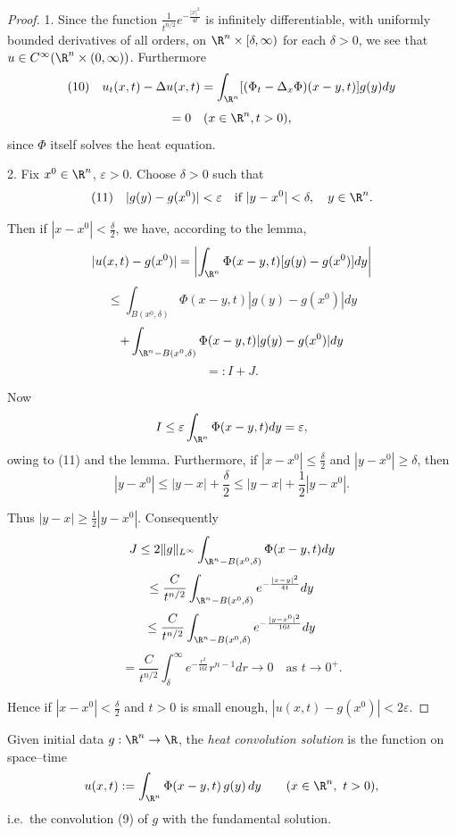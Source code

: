 \begin{proof}
1. Since the function $\frac{1}{t^{n/2}} e^{-\frac{|x|^2}{4t}}$ is infinitely differentiable, with uniformly bounded derivatives of all orders, on $\R^n \times [\delta, \infty)$ for each $\delta > 0$, we see that $u \in C^\infty(\R^n \times (0,\infty))$. Furthermore
$$(10) \quad u_t(x,t) - \Delta u(x,t) = \int_{\R^n} [(\Phi_t - \Delta_x \Phi)(x-y,t)]g(y) dy$$
$$= 0 \quad (x \in \R^n, t > 0),$$
since $\Phi$ itself solves the heat equation.

2. Fix $x^0 \in \R^n$, $\varepsilon > 0$. Choose $\delta > 0$ such that
$$(11) \quad |g(y) - g(x^0)| < \varepsilon \quad \text{if } |y - x^0| < \delta, \quad y \in \R^n.$$

Then if $|x - x^0| < \frac{\delta}{2}$, we have, according to the lemma,
$$|u(x,t) - g(x^0)| = \left|\int_{\R^n} \Phi(x-y,t)[g(y) - g(x^0)] dy\right|$$
$$\leq \int_{B(x^0,\delta)} \Phi(x-y,t)|g(y) - g(x^0)| dy$$
$$+ \int_{\R^n - B(x^0,\delta)} \Phi(x-y,t)|g(y) - g(x^0)| dy$$
$$=: I + J.$$

Now
$$I \leq \varepsilon \int_{\R^n} \Phi(x-y,t) dy = \varepsilon,$$
owing to (11) and the lemma. Furthermore, if $|x - x^0| \leq \frac{\delta}{2}$ and $|y - x^0| \geq \delta$, then
$$|y - x^0| \leq |y - x| + \frac{\delta}{2} \leq |y - x| + \frac{1}{2}|y - x^0|.$$

Thus $|y - x| \geq \frac{1}{2}|y - x^0|$. Consequently
$$J \leq 2\|g\|_{L^\infty} \int_{\R^n - B(x^0,\delta)} \Phi(x-y,t) dy$$
$$\leq \frac{C}{t^{n/2}} \int_{\R^n - B(x^0,\delta)} e^{-\frac{|x-y|^2}{4t}} dy$$
$$\leq \frac{C}{t^{n/2}} \int_{\R^n - B(x^0,\delta)} e^{-\frac{|y-x^0|^2}{16t}} dy$$
$$= \frac{C}{t^{n/2}} \int_{\delta}^{\infty} e^{-\frac{r^2}{16t}} r^{n-1} dr \to 0 \quad \text{as } t \to 0^+.$$

Hence if $|x - x^0| < \frac{\delta}{2}$ and $t > 0$ is small enough, $|u(x,t) - g(x^0)| < 2\varepsilon$.
\end{proof}

\begin{definition}
\label{def:heat-convolution-solution}
\leanok
Given initial data $g : \R^n \to \R$, the \textit{heat convolution solution} is the
function on space--time
$$u(x,t) := \int_{\R^n} \Phi(x-y,t)\,g(y)\,dy \qquad (x \in \R^n,\ t > 0),$$
i.e.\ the convolution (9) of $g$ with the fundamental solution.
\end{definition}

